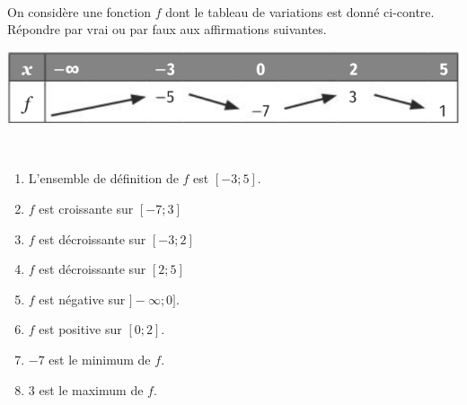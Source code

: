 \documentclass[11pt]{article}
\begin{document}
\begin{exo}~\\[1mm]
\begin{minipage}{.5\textwidth}
On considère une fonction $f$ dont le tableau de
variations est donné ci-contre. Répondre par vrai ou par faux aux affirmations
suivantes.
\end{minipage}
\begin{minipage}{.5\textwidth}
  \begin{center}
    \includegraphics[scale=.3]{tableauvar.png}
  \end{center}
\end{minipage}
~\\[-9mm]
\begin{multicols}{2}
\begin{enumerate}
  \item L'ensemble de définition de $f$ est $[-3;5]$.
  \item $f$ est croissante sur $[-7;3]$
  \item $f$ est d\'ecroissante sur $[-3;2]$
  \item $f$ est d\'ecroissante sur $[2;5]$
  \item $f$ est négative sur $]-\infty;0]$.
  \item $f$ est positive sur $[0;2]$.
  \item $-7$ est le minimum de $f$.
  \item $3$ est le maximum de $f$.
\end{enumerate}
\end{multicols}
\end{exo}
\end{document}
